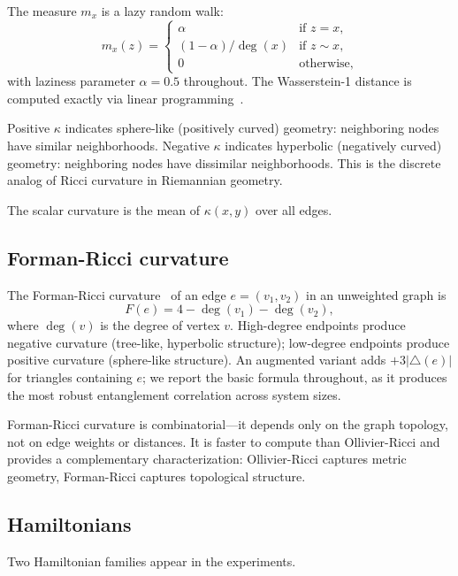 \documentclass[aps,pra,twocolumn,superscriptaddress]{revtex4-2}
\begin{document}
The measure $m_x$ is a lazy random walk:
\begin{equation}
m_x(z) = \begin{cases}
\alpha & \text{if } z = x, \\
(1-\alpha)/\deg(x) & \text{if } z \sim x, \\
0 & \text{otherwise},
\end{cases}
\end{equation}
with laziness parameter $\alpha = 0.5$ throughout. The Wasserstein-1 distance is computed exactly via linear programming~\cite{villani2009}.

Positive $\kappa$ indicates sphere-like (positively curved) geometry: neighboring nodes have similar neighborhoods. Negative $\kappa$ indicates hyperbolic (negatively curved) geometry: neighboring nodes have dissimilar neighborhoods. This is the discrete analog of Ricci curvature in Riemannian geometry.

The scalar curvature is the mean of $\kappa(x, y)$ over all edges.


\subsection{Forman-Ricci curvature}

The Forman-Ricci curvature~\cite{forman2003} of an edge $e = (v_1, v_2)$ in an unweighted graph is
\begin{equation}
F(e) = 4 - \deg(v_1) - \deg(v_2),
\label{eq:forman}
\end{equation}
where $\deg(v)$ is the degree of vertex $v$. High-degree endpoints produce negative curvature (tree-like, hyperbolic structure); low-degree endpoints produce positive curvature (sphere-like structure). An augmented variant adds $+3|\triangle(e)|$ for triangles containing $e$; we report the basic formula throughout, as it produces the most robust entanglement correlation across system sizes.

Forman-Ricci curvature is combinatorial---it depends only on the graph topology, not on edge weights or distances. It is faster to compute than Ollivier-Ricci and provides a complementary characterization: Ollivier-Ricci captures metric geometry, Forman-Ricci captures topological structure.


\subsection{Hamiltonians}

Two Hamiltonian families appear in the experiments.
\end{document}
